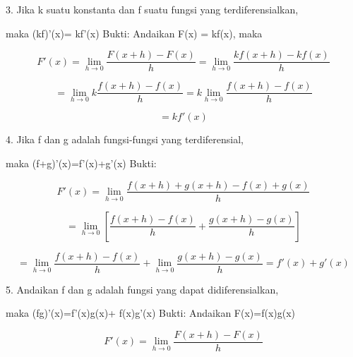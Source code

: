 \documentclass[a4paper,10pt]{article}
\begin{document}
\begin{eulernotebook}
\begin{eulercomment}
\begin{eulercomment}
\begin{eulercomment}
\begin{eulercomment}
\begin{eulercomment}
\begin{eulercomment}
\begin{eulercomment}
\begin{eulercomment}
\begin{eulercomment}
\begin{eulercomment}
\begin{eulercomment}
\begin{eulercomment}
\begin{eulercomment}
\begin{eulercomment}
\begin{eulercomment}
\begin{eulercomment}
\begin{eulercomment}
\begin{eulercomment}
\begin{eulercomment}
\begin{eulercomment}
\begin{eulerformula}
\end{eulerformula}
\begin{eulercomment}
3. Jika k suatu konstanta dan f suatu fungsi yang terdiferensialkan,\\
\end{eulercomment}
\begin{eulerttcomment}
   maka (kf)'(x)= kf'(x)
   Bukti:
   Andaikan F(x) = kf(x), maka
\end{eulerttcomment}
\begin{eulerformula}
\[
F'(x)=\lim_{h\to 0}\frac{F(x+h)-F(x)}{h}=\lim_{h\to 0}\frac{kf(x+h)-kf(x)}{h}
\]
\end{eulerformula}
\begin{eulerformula}
\[
    = \lim_{h\to 0}k \frac{f(x+h)-f(x)}{h}=k\lim_{h\to 0}\frac{f(x+h)-f(x)}{h}
\]
\end{eulerformula}
\begin{eulerformula}
\[
= kf'(x)
\]
\end{eulerformula}
\begin{eulercomment}
4. Jika f dan g adalah fungsi-fungsi yang terdiferensial,\\
\end{eulercomment}
\begin{eulerttcomment}
   maka (f+g)'(x)=f'(x)+g'(x)
   Bukti:
\end{eulerttcomment}
\begin{eulerformula}
\[
F'(x)=\lim_{h\to 0}\frac{f(x+h)+g(x+h)-f(x)+g(x)}{h}
\]
\end{eulerformula}
\begin{eulerformula}
\[
=\lim_{h\to 0}[\frac{f(x+h)-f(x)}{h}+\frac{g(x+h)-g(x)}{h}]
\]
\end{eulerformula}
\begin{eulerformula}
\[
=\lim_{h\to 0}\frac{f(x+h)-f(x)}{h}+\lim_{h\to 0}\frac{g(x+h)-g(x)}{h}=f'(x)+g'(x)
\]
\end{eulerformula}
\begin{eulercomment}
5. Andaikan f dan g adalah fungsi yang dapat didiferensialkan,\\
\end{eulercomment}
\begin{eulerttcomment}
   maka (fg)'(x)=f'(x)g(x)+ f(x)g'(x)
   Bukti:
   Andaikan F(x)=f(x)g(x)
\end{eulerttcomment}
\begin{eulerformula}
\[
F'(x)= \lim_{h\to 0}\frac{F(x+h)-F(x)}{h}
\]

\end{eulerformula}
\end{eulercomment}
\end{eulercomment}
\end{eulercomment}
\end{eulercomment}
\end{eulercomment}
\end{eulercomment}
\end{eulercomment}
\end{eulercomment}
\end{eulercomment}
\end{eulercomment}
\end{eulercomment}
\end{eulercomment}
\end{eulercomment}
\end{eulercomment}
\end{eulercomment}
\end{eulercomment}
\end{eulercomment}
\end{eulercomment}
\end{eulercomment}
\end{eulercomment}
\end{eulernotebook}
\end{document}
